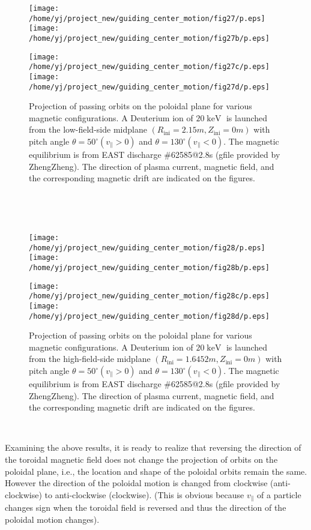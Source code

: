\documentclass{article}
\newcommand{\tmop}[1]{\ensuremath{\operatorname{#1}}}
\begin{document}
\begin{figure}[h]
  \texttt{[image: /home/yj/project\_new/guiding\_center\_motion/fig27/p.eps]}\texttt{[image: /home/yj/project\_new/guiding\_center\_motion/fig27b/p.eps]}
  
  \texttt{[image: /home/yj/project\_new/guiding\_center\_motion/fig27c/p.eps]}\texttt{[image: /home/yj/project\_new/guiding\_center\_motion/fig27d/p.eps]}
  \caption{\label{16-6-30-2}Projection of passing orbits on the poloidal plane
  for various magnetic configurations. A Deuterium ion of $20 \tmop{keV}$ is
  launched from the low-field-side midplane $(R_{\tmop{ini}} = 2.15 m,
  Z_{\tmop{ini}} = 0 m)$ with pitch angle $\theta = 50^{\circ} (v_{\parallel}
  > 0)$ and $\theta = 130^{\circ} (v_{\parallel} < 0)$. The magnetic
  equilibrium is from EAST discharge \#62585@2.8s (gfile provided by
  ZhengZheng). The direction of plasma current, magnetic field, and the
  corresponding magnetic drift are indicated on the figures.}
\end{figure}

\

\

\begin{figure}[h]
  \texttt{[image: /home/yj/project\_new/guiding\_center\_motion/fig28/p.eps]}\texttt{[image: /home/yj/project\_new/guiding\_center\_motion/fig28b/p.eps]}
  
  \texttt{[image: /home/yj/project\_new/guiding\_center\_motion/fig28c/p.eps]}\texttt{[image: /home/yj/project\_new/guiding\_center\_motion/fig28d/p.eps]}
  \caption{\label{16-6-30-3}Projection of passing orbits on the poloidal plane
  for various magnetic configurations. A Deuterium ion of $20 \tmop{keV}$ is
  launched from the high-field-side midplane $(R_{\tmop{ini}} = 1.6452 m,
  Z_{\tmop{ini}} = 0 m)$ with pitch angle $\theta = 50^{\circ} (v_{\parallel}
  > 0)$ and $\theta = 130^{\circ} (v_{\parallel} < 0)$. The magnetic
  equilibrium is from EAST discharge \#62585@2.8s (gfile provided by
  ZhengZheng). The direction of plasma current, magnetic field, and the
  corresponding magnetic drift are indicated on the figures.}
\end{figure}

\

Examining the above results, it is ready to realize that reversing the
direction of the toroidal magnetic field does not change the projection of
orbits on the poloidal plane, i.e., the location and shape of the poloidal
orbits remain the same. However the direction of the poloidal motion is
changed from clockwise (anti-clockwise) to anti-clockwise (clockwise). (This
is obvious because $v_{\parallel}$ of a particle changes sign when the
toroidal field is reversed and thus the direction of the poloidal motion
changes).
\end{document}
